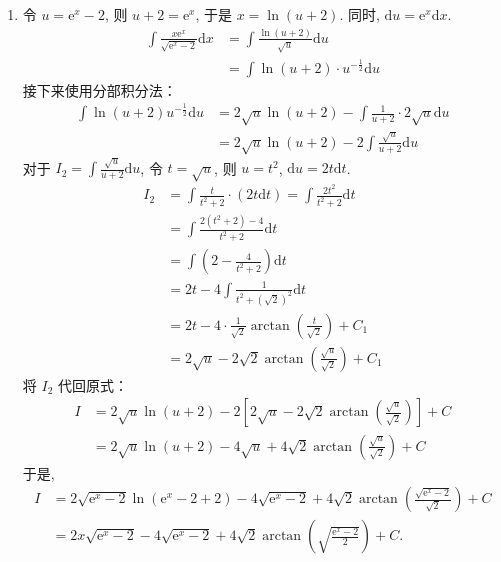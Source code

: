 \begin{solution}
\begin{enumerate}
        \item 令 $u = \mathrm{e}^x - 2$, 则 $u + 2 = \mathrm{e}^x$, 于是 $x = \ln(u + 2)$.
              同时, $\mathrm{d}u = \mathrm{e}^x \mathrm{d}x$.
              \begin{align*}
                  \int \frac{x \mathrm{e}^x}{\sqrt{\mathrm{e}^{x} - 2}} \mathrm{d}x & = \int \frac{\ln(u + 2)}{\sqrt{u}} \mathrm{d}u       \\
                                                                                    & = \int \ln(u + 2) \cdot u^{-\frac{1}{2}} \mathrm{d}u
              \end{align*}
              接下来使用分部积分法：
              \begin{align*}
                  \int \ln(u + 2) u^{-\frac{1}{2}} \mathrm{d}u & = 2\sqrt{u} \ln(u + 2) - \int \frac{1}{u + 2} \cdot 2\sqrt{u} \mathrm{d}u \\
                                                               & = 2\sqrt{u} \ln(u + 2) - 2 \int \frac{\sqrt{u}}{u + 2} \mathrm{d}u
              \end{align*}
              对于 $I_2 = \int \frac{\sqrt{u}}{u + 2} \mathrm{d}u$, 令 $t = \sqrt{u}$, 则 $u = t^2$, $\mathrm{d}u = 2t \mathrm{d}t$.
              \begin{align*}
                  I_2 & = \int \frac{t}{t^2 + 2} \cdot (2t \mathrm{d}t) = \int \frac{2t^2}{t^2 + 2} \mathrm{d}t \\
                      & = \int \frac{2(t^2 + 2) - 4}{t^2 + 2} \mathrm{d}t                                       \\
                      & = \int \left( 2 - \frac{4}{t^2 + 2} \right) \mathrm{d}t                                 \\
                      & = 2t - 4 \int \frac{1}{t^2 + (\sqrt{2})^2} \mathrm{d}t                                  \\
                      & = 2t - 4 \cdot \frac{1}{\sqrt{2}} \arctan\left(\frac{t}{\sqrt{2}}\right) + C_1          \\
                      & = 2\sqrt{u} - 2\sqrt{2} \arctan\left(\frac{\sqrt{u}}{\sqrt{2}}\right) + C_1
              \end{align*}
              将 $I_2$ 代回原式：
              \begin{align*}
                  I & = 2\sqrt{u} \ln(u + 2) - 2 \left[ 2\sqrt{u} - 2\sqrt{2} \arctan\left(\frac{\sqrt{u}}{\sqrt{2}}\right) \right] + C \\
                    & = 2\sqrt{u} \ln(u + 2) - 4\sqrt{u} + 4\sqrt{2} \arctan\left(\frac{\sqrt{u}}{\sqrt{2}}\right) + C
              \end{align*}
              于是,
              \begin{align*}
                  I & = 2\sqrt{\mathrm{e}^x - 2} \ln(\mathrm{e}^x - 2 + 2) - 4\sqrt{\mathrm{e}^x - 2} + 4\sqrt{2} \arctan\left(\frac{\sqrt{\mathrm{e}^x - 2}}{\sqrt{2}}\right) + C \\
                    & = 2x\sqrt{\mathrm{e}^x - 2} - 4\sqrt{\mathrm{e}^x - 2} + 4\sqrt{2} \arctan\left(\sqrt{\frac{\mathrm{e}^x - 2}{2}}\right) + C.
              \end{align*}


\end{enumerate}
\end{solution}
